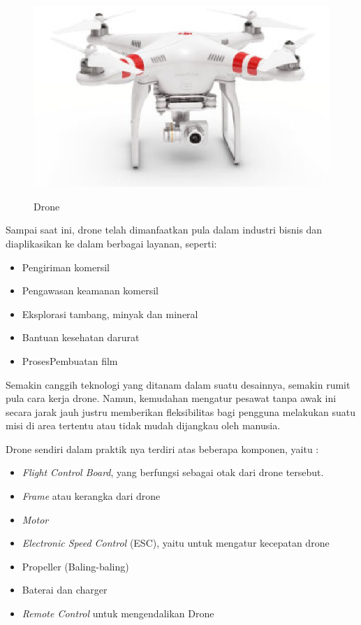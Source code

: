 \documentclass[9pt,twocolumn,twoside]{Gunadarma}
\begin{document}
\begin{figure}[htbp]
	\begin{center}
		\includegraphics[width=1\columnwidth]{drone.eps} \label{fig:1-noFCase1}
	\end{center}
	\caption{Drone}
\end{figure}

Sampai saat ini, drone telah dimanfaatkan pula dalam industri bisnis dan diaplikasikan ke dalam berbagai layanan, seperti:
\begin{itemize}
	\item Pengiriman komersil
	\item Pengawasan keamanan komersil
	\item Eksplorasi tambang, minyak dan mineral
	\item Bantuan kesehatan darurat
	\item ProsesPembuatan film
\end{itemize}
Semakin canggih teknologi yang ditanam dalam suatu desainnya, semakin rumit pula cara kerja drone. Namun, kemudahan mengatur pesawat tanpa awak ini secara jarak jauh justru memberikan fleksibilitas bagi pengguna melakukan suatu misi di area tertentu atau tidak mudah dijangkau oleh manusia.

Drone sendiri dalam praktik nya terdiri atas beberapa komponen, yaitu :
\begin{itemize}
	\item \textit{Flight Control Board}, yang berfungsi sebagai otak dari drone tersebut. 
	\item \textit{Frame} atau kerangka dari drone
	\item \textit{Motor}
	\item \textit{Electronic Speed Control} (ESC), yaitu untuk mengatur kecepatan drone
	\item Propeller (Baling-baling)
	\item Baterai dan charger
	\item \textit{Remote Control} untuk mengendalikan Drone
\end{itemize}
\end{document}
